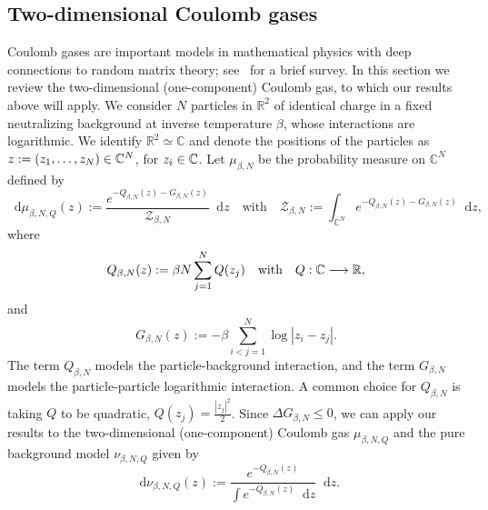 \documentclass[10pt]{amsart}
\theoremstyle{definition}\newtheorem{defi}[theo]{Definition}\newtheorem{rema}[theo]{Remark}\newtheorem{exam}[theo]{Example}\newtheorem{exem}[theo]{Example}\newtheorem{nota}[theo]{Notation}
\newcommand{\R}{\mathbb R}
\newcommand{\C}{\mathbb C}
\newcommand{\source}{\mu}
\newcommand{\target}{\nu}
\newcommand*\diff{\mathop{}\!\mathrm{d}}
\newcommand{\clZ}{\mathcal{Z}}
\renewcommand*{\to}{\mathchoice{\longrightarrow}{\rightarrow}{\rightarrow}{\rightarrow}}
\let\oldin\in
\renewcommand{\in}{\mathchoice{\oldin}{\oldin}{\,\oldin\,}{\,\oldin\,}}
\begin{document}
\subsection{Two-dimensional Coulomb gases}\label{subsec:plasma_intro}
Coulomb gases are important models in mathematical physics with deep connections to random matrix theory; see~\cite{MR4619310} for a brief survey. In this section we review the two-dimensional (one-component) Coulomb gas, to which our results above will apply. We consider $N$ particles in $\R^2$ of identical charge in a fixed neutralizing background at inverse temperature $\beta$, whose interactions are logarithmic. We identify $\R^2 \simeq\C$ and denote the positions of the particles as $z:=(z_1,\ldots,z_N)\in\C^N$, for $z_i\in \C$. Let $\source_{\beta,N}$ be the probability measure on $\C^{N}$ defined by
\begin{equation}\label{eq:mu_betaN}
\diff \source_{\beta,N,Q}(z):=\frac{e^{-Q_{\beta,N}(z)-G_{\beta,N}(z)}}{\clZ_{\beta, N}}\diff z\quad \text{with}\quad \clZ_{\beta, N}:=\int_{\C^N}e^{-Q_{\beta,N}(z)-G_{\beta,N}(z)}\diff z,
\end{equation}
where
\begin{equation}\label{eq:Q_betaN}
Q_{\beta,N}(z):=\beta N\sum_{j=1}^NQ(z_j)\quad\text{with}\quad Q:\C\to \R,
\end{equation}
and
\begin{equation}\label{eq:G_betaN}
G_{\beta,N}(z):=-\beta \sum_{i<j=1}^N\log |z_i-z_j|.
\end{equation}
The term $Q_{\beta,N}$ models the particle-background interaction, and the term $G_{\beta,N}$ models the particle-particle logarithmic interaction. A common choice for $Q_{\beta,N}$ is taking $Q$ to be quadratic, $Q(z_j)=\frac{|z_j|^2}{2}$. Since $\Delta G_{\beta,N}\le 0$, we can apply our results to the two-dimensional (one-component) Coulomb gas $\source_{\beta,N,Q}$ and the pure background model $\target_{\beta,N,Q}$ given by
\[
\diff \target_{\beta,N,Q}(z):=\frac{e^{-Q_{\beta,N}(z)}}{\int e^{-Q_{\beta,N}(z)}\diff z}\diff z.
\]
\end{document}
